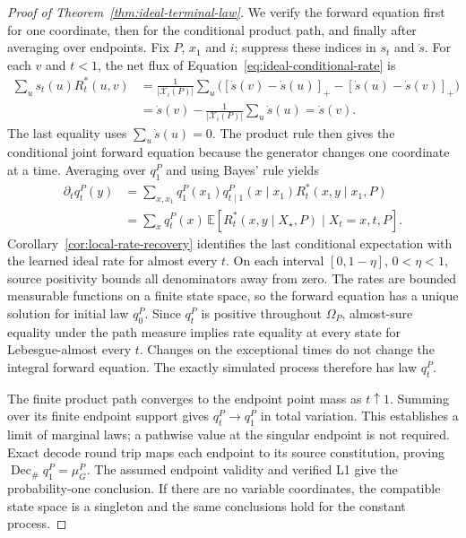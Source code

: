 \documentclass{article}
\theoremstyle{definition}
\begin{document}
\begin{proof}[Proof of Theorem~\ref{thm:ideal-terminal-law}]
We verify the forward equation first for one coordinate, then for the conditional product path,
and finally after averaging over endpoints. Fix $P$, $x_1$ and $i$; suppress these indices in
$s_t$ and $\dot s$. For each $v$ and $t<1$, the net flux of Equation~\ref{eq:ideal-conditional-rate}
is
\begin{align}
 \sum_u s_t(u)R_t^*(u,v)
 &=\frac{1}{|\mathcal X_i(P)|}\sum_u
 \bigl([\dot s(v)-\dot s(u)]_+-[\dot s(u)-\dot s(v)]_+\bigr)\\
 &=\dot s(v)-\frac{1}{|\mathcal X_i(P)|}\sum_u\dot s(u)
 =\dot s(v).
\end{align}
The last equality uses $\sum_u\dot s(u)=0$. The product rule then gives the conditional joint
forward equation because the generator changes one coordinate at a time. Averaging over $q_1^P$
and using Bayes' rule yields
\begin{align}
 \partial_t q_t^P(y)
 &=\sum_{x,x_1}q_1^P(x_1)q_{t\mid1}^P(x\mid x_1)R_t^*(x,y\mid x_1,P)\\
 &=\sum_x q_t^P(x)\,
 \mathbb E[R_t^*(x,y\mid X_\star,P)\mid X_t=x,t,P].
\end{align}
Corollary~\ref{cor:local-rate-recovery} identifies the last conditional expectation with the
learned ideal rate for almost every $t$. On each interval $[0,1-\eta]$, $0<\eta<1$, source
positivity bounds all denominators away from zero. The rates are bounded measurable functions on a
finite state space, so the forward equation has a unique solution for initial law $q_0^P$.
Since $q_t^P$ is positive throughout $\Omega_P$, almost-sure equality under the path measure implies
rate equality at every state for Lebesgue-almost every $t$. Changes on the exceptional times do not
change the integral forward equation. The exactly simulated process therefore has law $q_t^P$.

The finite product path converges to the endpoint point mass as $t\uparrow1$. Summing over its
finite endpoint support gives $q_t^P\to q_1^P$ in total variation. This establishes a limit of
marginal laws; a pathwise value at the singular endpoint is not required. Exact decode round trip
maps each endpoint to its source constitution, proving
$\operatorname{Dec}_{\#}q_1^P=\mu_G^P$. The assumed endpoint validity and verified L1 give the
probability-one conclusion. If there are no variable coordinates, the compatible state space is a
singleton and the same conclusions hold for the constant process.
\end{proof}
\end{document}
